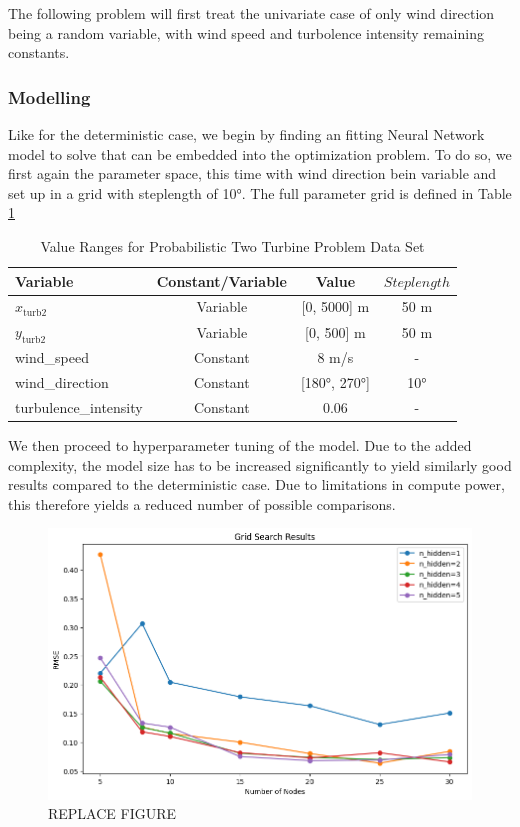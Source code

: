 The following problem will first treat the univariate case of only wind direction being a random variable, with wind speed and turbolence intensity remaining constants. 

\subsubsection{Modelling}

Like for the deterministic case, we begin by finding an fitting Neural Network model to solve that can be embedded into the optimization problem. To do so, we  first again the parameter space, this time with wind direction bein variable and set up in a grid with steplength of 10°. The full parameter grid is defined in Table \ref{tab:val_prob_data}

\begin{table}[ht]
	\centering
	\caption{Value Ranges for Probabilistic Two Turbine Problem Data Set}
	\begin{tabular}{|l|c|c|c|}
		\hline
		\textbf{Variable} & \textbf{Constant/Variable} & \textbf{Value} & \textbf{$Steplength$}\\
		\hline
		$x_{\text{turb2}}$ & Variable & [0, 5000] m & 50 m\\
		$y_{\text{turb2}}$ & Variable & [0, 500] m  & 50 m\\
		wind\_speed & Constant & 8 m/s & -\\
		wind\_direction & Constant & [180°, 270°]& 10° \\
		turbulence\_intensity & Constant & 0.06 & - \\
		\hline
	\end{tabular}
	\label{tab:val_prob_data}
\end{table}

We then proceed to hyperparameter tuning of the model. Due to the added complexity, the model size has to be increased significantly to yield similarly good results compared to the deterministic case. Due to limitations in compute power, this therefore yields a reduced number of possible comparisons.


\begin{figure}[h] 
	\centering
	\includegraphics[width=1\textwidth]{figures/optimization/determ_nn_opti.png} 
	\caption{REPLACE FIGURE}
	\label{fig:determ_nn_opti}
\end{figure}



